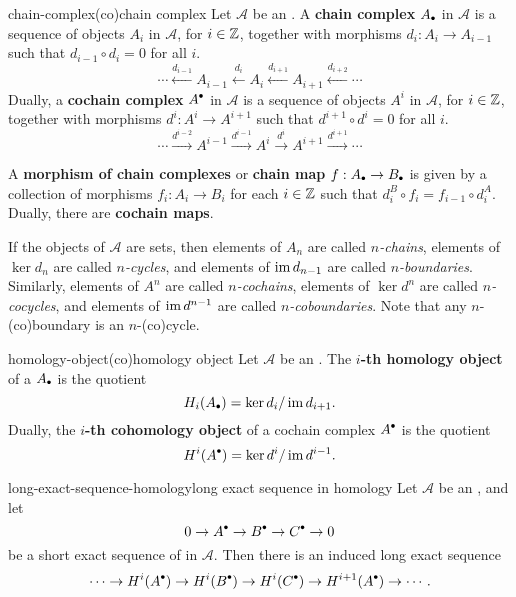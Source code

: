 \begin{topic}{chain-complex}{(co)chain complex}
    Let $\mathcal{A}$ be an . A \textbf{chain complex} $A_\bdot$ in $\mathcal{A}$ is a sequence of objects $A_i$ in $\mathcal{A}$, for $i \in \mathbb{Z}$, together with morphisms $d_i : A_i \to A_{i - 1}$ such that $d_{i - 1} \circ d_i = 0$ for all $i$.
    \[ \cdots \xleftarrow{d_{i - 1}} A_{i - 1} \xleftarrow{d_i} A_i \xleftarrow{d_{i + 1}} A_{i + 1} \xleftarrow{d_{i + 2}} \cdots \]
    Dually, a \textbf{cochain complex} $A^\bdot$ in $\mathcal{A}$ is a sequence of objects $A^i$ in $\mathcal{A}$, for $i \in \mathbb{Z}$, together with morphisms $d^i : A^i \to A^{i + 1}$ such that $d^{i + 1} \circ d^i = 0$ for all $i$.
    \[ \cdots \xrightarrow{d^{i - 2}} A^{i - 1} \xrightarrow{d^{i - 1}} A^i \xrightarrow{d^i} A^{i + 1} \xrightarrow{d^{i + 1}} \cdots \]
    
    A \textbf{morphism of chain complexes} or \textbf{chain map} $f : A_\bdot \to B_\bdot$ is given by a collection of morphisms $f_i : A_i \to B_i$ for each $i \in \mathbb{Z}$ such that $d^B_i \circ f_i = f_{i - 1} \circ d^A_i$. Dually, there are \textbf{cochain maps}.
    
    If the objects of $\mathcal{A}$ are sets, then elements of $A_n$ are called \textit{$n$-chains}, elements of $\ker d_n$ are called \textit{$n$-cycles}, and elements of $\operatorname{im} d_{n - 1}$ are called \textit{$n$-boundaries}. Similarly, elements of $A^n$ are called \textit{$n$-cochains}, elements of $\ker d^n$ are called \textit{$n$-cocycles}, and elements of $\operatorname{im} d^{n - 1}$ are called \textit{$n$-coboundaries}. Note that any $n$-(co)boundary is an $n$-(co)cycle.
\end{topic}

\begin{topic}{homology-object}{(co)homology object}
    Let $\mathcal{A}$ be an . The \textbf{$i$-th homology object} of a  $A_\bdot$ is the quotient
    \[ H_i(A_\bdot) = \ker d_i / \im d_{i + 1} . \]
    Dually, the \textbf{$i$-th cohomology object} of a cochain complex $A^\bdot$ is the quotient
    \[ H^i(A^\bdot) = \ker d^i / \im d^{i - 1} . \]
\end{topic}

\begin{topic}{long-exact-sequence-homology}{long exact sequence in homology}
    Let $\mathcal{A}$ be an , and let
    \[ 0 \rightarrow A^\bdot \rightarrow B^\bdot \rightarrow C^\bdot \rightarrow 0 \]
    be a short exact sequence of  in $\mathcal{A}$. Then there is an induced long exact sequence
    \[ \cdots \rightarrow H^i(A^\bdot) \rightarrow H^i(B^\bdot) \rightarrow H^i(C^\bdot) \rightarrow H^{i + 1}(A^\bdot) \rightarrow \cdots . \]
\end{topic}

